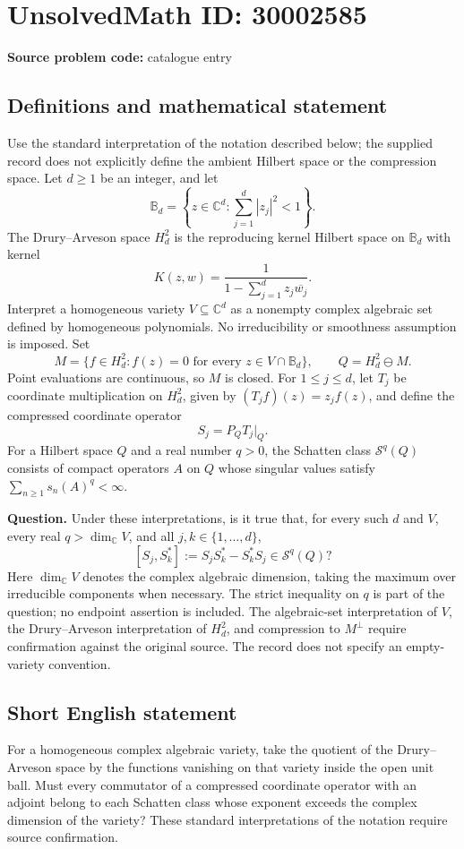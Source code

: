\documentclass[11pt]{article}
\newcommand{\C}{\mathbb{C}}
\begin{document}
\section*{UnsolvedMath ID: 30002585}
\textbf{Source problem code:} catalogue entry
\subsection{Definitions and mathematical statement}
Use the standard interpretation of the notation described below; the supplied record does not explicitly define the ambient Hilbert space or the compression space. Let \(d\geq 1\) be an integer, and let
\[
\mathbb B_d=\left\{z\in\C^d:\sum_{j=1}^d|z_j|^2<1\right\}.
\]
The Drury--Arveson space \(H_d^2\) is the reproducing kernel Hilbert space on \(\mathbb B_d\) with kernel
\[
K(z,w)=\frac{1}{1-\sum_{j=1}^d z_j\overline{w_j}}.
\]
Interpret a homogeneous variety \(V\subseteq\C^d\) as a nonempty complex algebraic set defined by homogeneous polynomials. No irreducibility or smoothness assumption is imposed. Set
\[
M=\{f\in H_d^2:f(z)=0\text{ for every }z\in V\cap\mathbb B_d\},\qquad Q=H_d^2\ominus M.
\]
Point evaluations are continuous, so \(M\) is closed. For \(1\leq j\leq d\), let \(T_j\) be coordinate multiplication on \(H_d^2\), given by \((T_jf)(z)=z_jf(z)\), and define the compressed coordinate operator
\[
S_j=P_QT_j\big|_Q.
\]
For a Hilbert space \(Q\) and a real number \(q>0\), the Schatten class \(\mathcal S^q(Q)\) consists of compact operators \(A\) on \(Q\) whose singular values satisfy \(\sum_{n\geq1}s_n(A)^q<\infty\).

\textbf{Question.} Under these interpretations, is it true that, for every such \(d\) and \(V\), every real \(q>\dim_{\C}V\), and all \(j,k\in\{1,\ldots,d\}\),
\[
[S_j,S_k^*]:=S_jS_k^*-S_k^*S_j\in\mathcal S^q(Q)?
\]
Here \(\dim_{\C}V\) denotes the complex algebraic dimension, taking the maximum over irreducible components when necessary. The strict inequality on \(q\) is part of the question; no endpoint assertion is included. The algebraic-set interpretation of \(V\), the Drury--Arveson interpretation of \(H_d^2\), and compression to \(M^\perp\) require confirmation against the original source. The record does not specify an empty-variety convention.
\subsection{Short English statement}
For a homogeneous complex algebraic variety, take the quotient of the Drury--Arveson space by the functions vanishing on that variety inside the open unit ball. Must every commutator of a compressed coordinate operator with an adjoint belong to each Schatten class whose exponent exceeds the complex dimension of the variety? These standard interpretations of the notation require source confirmation.
\end{document}
